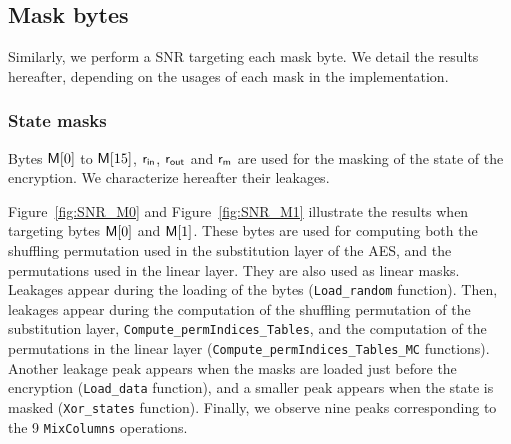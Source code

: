 \subsection{Mask bytes}
Similarly, we perform a SNR targeting each mask byte. We detail the results hereafter, depending on the usages of each mask in the implementation.

\subsubsection{State masks}
Bytes $\mathsf{M}[0]$ to $\mathsf{M}[15]$, $\mathsf{r_{in}}$, $\mathsf{r_{out}}$ and $\mathsf{r_m}$ are used for the masking of the state of the encryption. We characterize hereafter their leakages.
 
Figure~\ref{fig:SNR_M0} and Figure~\ref{fig:SNR_M1} illustrate the results when targeting bytes $\mathsf{M}[0]$ and $\mathsf{M}[1]$. 
These bytes are used for computing both the shuffling permutation used in the substitution layer of the AES, and the permutations used in the linear layer. 
They are also used as linear masks.
Leakages appear during the loading of the bytes (\texttt{Load\_random} function).
Then, leakages appear during the computation of the shuffling permutation of the substitution layer, \texttt{Compute\_permIndices\_Tables}, and the computation of the permutations in the linear layer (\texttt{Compute\_permIndices\_Tables\_MC} functions).
Another leakage peak appears when the masks are loaded just before the encryption (\texttt{Load\_data} function), and a smaller peak appears when the state is masked (\texttt{Xor\_states} function).
Finally, we observe nine peaks corresponding to the 9 \texttt{MixColumns} operations.

